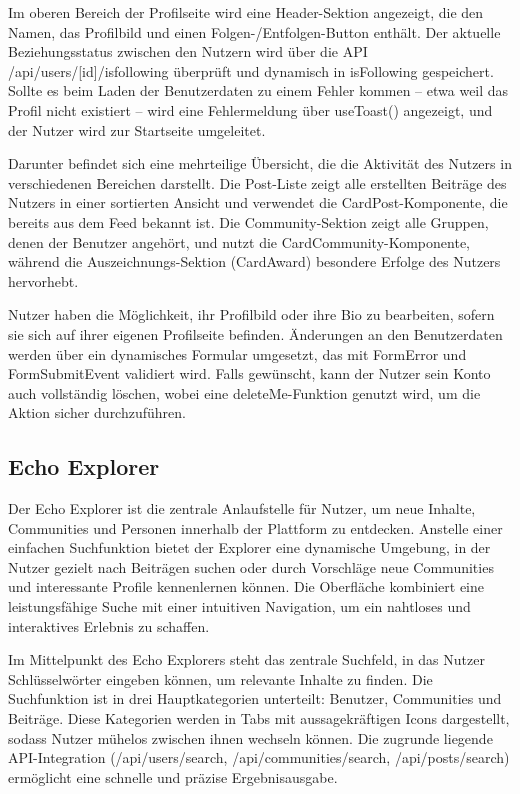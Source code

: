 \documentclass[a4paper,12pt]{article}
\begin{document}
Im oberen Bereich der Profilseite wird eine Header-Sektion angezeigt, die den
Namen, das Profilbild und einen Folgen-/Entfolgen-Button enthält. Der aktuelle
Beziehungsstatus zwischen den Nutzern wird über die API
/api/users/[id]/isfollowing überprüft und dynamisch in isFollowing gespeichert.
Sollte es beim Laden der Benutzerdaten zu einem Fehler kommen – etwa weil das
Profil nicht existiert – wird eine Fehlermeldung über useToast() angezeigt, und
der Nutzer wird zur Startseite umgeleitet.

Darunter befindet sich eine mehrteilige Übersicht, die die Aktivität des
Nutzers in verschiedenen Bereichen darstellt. Die Post-Liste zeigt alle
erstellten Beiträge des Nutzers in einer sortierten Ansicht und verwendet die
CardPost-Komponente, die bereits aus dem Feed bekannt ist. Die
Community-Sektion zeigt alle Gruppen, denen der Benutzer angehört, und nutzt
die CardCommunity-Komponente, während die Auszeichnungs-Sektion (CardAward)
besondere Erfolge des Nutzers hervorhebt.

Nutzer haben die Möglichkeit, ihr Profilbild oder ihre Bio zu bearbeiten,
sofern sie sich auf ihrer eigenen Profilseite befinden. Änderungen an den
Benutzerdaten werden über ein dynamisches Formular umgesetzt, das mit FormError
und FormSubmitEvent validiert wird. Falls gewünscht, kann der Nutzer sein Konto
auch vollständig löschen, wobei eine deleteMe-Funktion genutzt wird, um die
Aktion sicher durchzuführen.

\subsection{Echo Explorer}
Der Echo Explorer ist die zentrale Anlaufstelle für Nutzer, um
neue Inhalte, Communities und Personen innerhalb der Plattform zu entdecken.
Anstelle einer einfachen Suchfunktion bietet der Explorer eine dynamische
Umgebung, in der Nutzer gezielt nach Beiträgen suchen oder durch Vorschläge
neue Communities und interessante Profile kennenlernen können. Die Oberfläche
kombiniert eine leistungsfähige Suche mit einer intuitiven Navigation, um ein
nahtloses und interaktives Erlebnis zu schaffen.

Im Mittelpunkt des Echo Explorers steht das zentrale Suchfeld, in das Nutzer
Schlüsselwörter eingeben können, um relevante Inhalte zu finden. Die
Suchfunktion ist in drei Hauptkategorien unterteilt: Benutzer, Communities und
Beiträge. Diese Kategorien werden in Tabs mit aussagekräftigen Icons
dargestellt, sodass Nutzer mühelos zwischen ihnen wechseln können. Die zugrunde
liegende API-Integration (/api/users/search, /api/communities/search,
/api/posts/search) ermöglicht eine schnelle und präzise Ergebnisausgabe.
\end{document}
